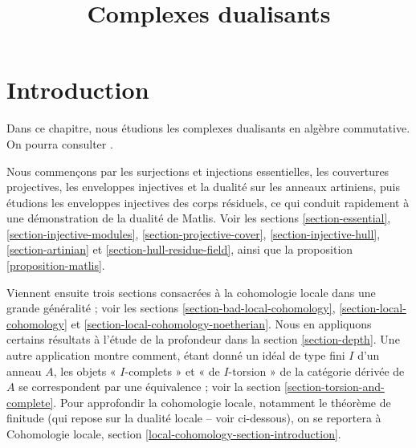 

%


\title{Complexes dualisants}


\maketitle

\label{section-phantom}

\tableofcontents

\section{Introduction}
\label{section-introduction}

\noindent
Dans ce chapitre, nous étudions les complexes dualisants en algèbre commutative.
On pourra consulter \cite{RD}.

\medskip\noindent
Nous commençons par les surjections et injections essentielles,
les couvertures projectives, les enveloppes injectives et la dualité
sur les anneaux artiniens, puis étudions les enveloppes injectives
des corps résiduels, ce qui conduit rapidement à une démonstration
de la dualité de Matlis. Voir les sections \ref{section-essential},
\ref{section-injective-modules}, \ref{section-projective-cover}, \ref{section-injective-hull}, \ref{section-artinian} et \ref{section-hull-residue-field},
ainsi que la proposition \ref{proposition-matlis}.

\medskip\noindent
Viennent ensuite trois sections consacrées à la cohomologie locale
dans une grande généralité ; voir les sections \ref{section-bad-local-cohomology},
\ref{section-local-cohomology} et \ref{section-local-cohomology-noetherian}.
Nous en appliquons certains résultats à l'étude de la profondeur
dans la section \ref{section-depth}. Une autre application montre comment,
étant donné un idéal de type fini $I$ d'un anneau $A$,
les objets « $I$-complets » et « de $I$-torsion »
de la catégorie dérivée de $A$ se correspondent par une équivalence ;
voir la section \ref{section-torsion-and-complete}.
Pour approfondir la cohomologie locale, notamment le théorème de finitude
(qui repose sur la dualité locale -- voir ci-dessous), on se reportera à
Cohomologie locale, section \ref{local-cohomology-section-introduction}.

